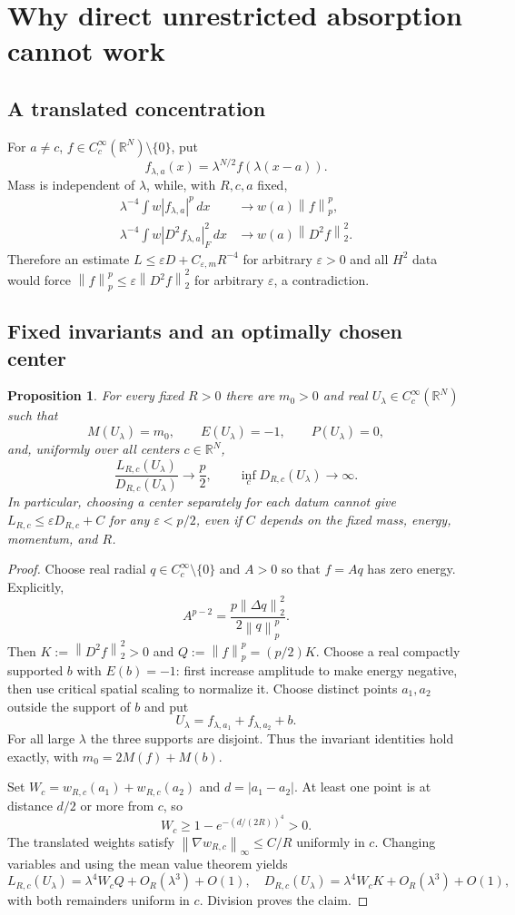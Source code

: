 \documentclass[11pt,a4paper]{article}
\newtheorem{proposition}[theorem]{Proposition}
\theoremstyle{remark}\newtheorem{remark}[theorem]{Remark}
\newcommand{\R}{\mathbb R}
\newcommand{\dd}{\,dx}
\newcommand{\norm}[1]{\left\|#1\right\|}
\begin{document}
\section{Why direct unrestricted absorption cannot work}
\subsection{A translated concentration}
For $a\ne c$, $f\in C_c^\infty(\R^N)\setminus\{0\}$, put
\[
 f_{\lambda,a}(x)=\lambda^{N/2}f(\lambda(x-a)).
\]
Mass is independent of $\lambda$, while, with $R,c,a$ fixed,
\begin{align*}
 \lambda^{-4}\int w|f_{\lambda,a}|^p\dd&\longrightarrow w(a)\norm f_p^p,\\
 \lambda^{-4}\int w|D^2f_{\lambda,a}|_F^2\dd&\longrightarrow w(a)\norm{D^2f}_2^2.
\end{align*}
Therefore an estimate $L\le\varepsilon D+C_{\varepsilon,m}R^{-4}$ for arbitrary $\varepsilon>0$ and all $H^2$ data would force
$\norm f_p^p\le\varepsilon\norm{D^2f}_2^2$ for arbitrary $\varepsilon$, a contradiction.

\subsection{Fixed invariants and an optimally chosen center}
\begin{proposition}\label{prop:nogo}
For every fixed $R>0$ there are $m_0>0$ and real $U_\lambda\in C_c^\infty(\R^N)$ such that
\[
 M(U_\lambda)=m_0,\qquad E(U_\lambda)=-1,\qquad P(U_\lambda)=0,
\]
and, uniformly over all centers $c\in\R^N$,
\[
 \frac{L_{R,c}(U_\lambda)}{D_{R,c}(U_\lambda)}\longrightarrow\frac p2,
 \qquad \inf_c D_{R,c}(U_\lambda)\longrightarrow\infty.
\]
In particular, choosing a center separately for each datum cannot give
$L_{R,c}\le\varepsilon D_{R,c}+C$ for any $\varepsilon<p/2$, even if $C$ depends on the fixed mass, energy, momentum, and $R$.
\end{proposition}
\begin{proof}
Choose real radial $q\in C_c^\infty\setminus\{0\}$ and $A>0$ so that $f=Aq$ has zero energy. Explicitly,
\[
 A^{p-2}=\frac{p\norm{\Delta q}_2^2}{2\norm q_p^p}.
\]
Then $K:=\norm{D^2f}_2^2>0$ and $Q:=\norm f_p^p=(p/2)K$. Choose a real compactly supported $b$ with $E(b)=-1$: first increase amplitude to make energy negative, then use critical spatial scaling to normalize it. Choose distinct points $a_1,a_2$ outside the support of $b$ and put
\[
 U_\lambda=f_{\lambda,a_1}+f_{\lambda,a_2}+b.
\]
For all large $\lambda$ the three supports are disjoint. Thus the invariant identities hold exactly, with $m_0=2M(f)+M(b)$.

Set $W_c=w_{R,c}(a_1)+w_{R,c}(a_2)$ and $d=|a_1-a_2|$. At least one point is at distance $d/2$ or more from $c$, so
\[
 W_c\ge1-e^{-(d/(2R))^4}>0.
\]
The translated weights satisfy $\norm{\nabla w_{R,c}}_\infty\le C/R$ uniformly in $c$. Changing variables and using the mean value theorem yields
\[
 L_{R,c}(U_\lambda)=\lambda^4W_cQ+O_R(\lambda^3)+O(1),\quad
 D_{R,c}(U_\lambda)=\lambda^4W_cK+O_R(\lambda^3)+O(1),
\]
with both remainders uniform in $c$. Division proves the claim.
\end{proof}
\end{document}
